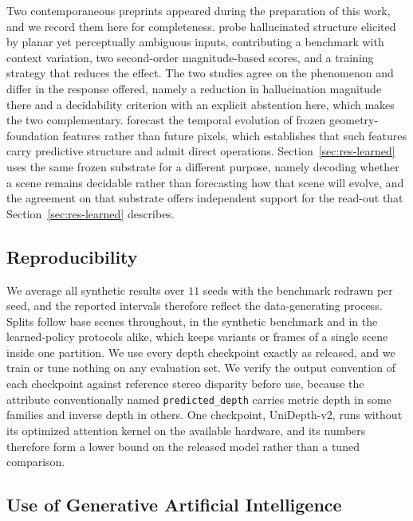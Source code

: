 \documentclass{article} %
\theoremstyle{defstyle}
\theoremstyle{plain}
\begin{document}
Two contemporaneous preprints appeared during the preparation of this work, and we record
them here for completeness. \citet{mirage2026} probe hallucinated structure elicited by
planar yet perceptually ambiguous inputs, contributing a benchmark with context variation,
two second-order magnitude-based scores, and a training strategy that reduces the effect.
The two studies agree on the phenomenon and differ in the response offered,
namely a reduction in hallucination magnitude there and a decidability criterion with an
explicit abstention here, which makes the two complementary. \citet{vggtworld2026} forecast
the temporal evolution of frozen geometry-foundation features rather than future pixels,
which establishes that such features carry predictive structure and admit direct operations.
Section~\ref{sec:res-learned} uses the same frozen substrate for a different purpose, namely
decoding whether a scene remains decidable rather than forecasting how that scene will
evolve, and the agreement on that substrate offers independent support for the read-out that
Section~\ref{sec:res-learned} describes.

\subsection{Reproducibility}
\label{sec:supp-repro}

We average all synthetic results over $11$ seeds with the benchmark redrawn per seed, and
the reported intervals therefore reflect the data-generating process. Splits follow base
scenes throughout, in the synthetic benchmark and in the learned-policy protocols alike,
which keeps variants or frames of a single scene inside one partition. We use every depth
checkpoint exactly as released, and we train or tune nothing on any evaluation set. We verify
the output convention of each checkpoint against reference stereo disparity before use,
because the attribute conventionally named \texttt{predicted\_depth} carries metric depth in
some families and inverse depth in others. One checkpoint, UniDepth-v2, runs without its
optimized attention kernel on the available hardware, and its numbers therefore form a lower
bound on the released model rather than a tuned comparison.



\subsection{Use of Generative Artificial Intelligence}
\label{sec:supp-ai-disclosure}
\end{document}
